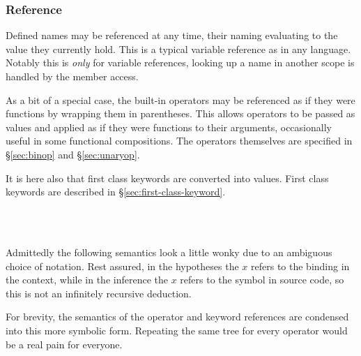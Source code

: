 \subsubsection{Reference}

Defined names may be referenced at any time, their naming evaluating to the value
they currently hold. This is a typical variable reference as in any language.
Notably this is \emph{only} for variable references, looking up a name in another
scope is handled by the member access.

As a bit of a special case, the built-in operators may be referenced as if they
were functions by wrapping them in parentheses. This allows operators to be passed
as values and applied as if they were functions to their arguments, occasionally
useful in some functional compositions. The operators themselves are specified
in \S\ref{sec:binop} and \S\ref{sec:unaryop}.

It is here also that first class keywords are converted into values.
First class keywords are described in \S\ref{sec:first-class-keyword}.

\begin{bnf*}
     \\
     \\
\end{bnf*}

Admittedly the following semantics look a little wonky due to an ambiguous choice
of notation. Rest assured, in the hypotheses the $x$ refers to the binding in the
context, while in the inference the $x$ refers to the symbol in source code, so
this is not an infinitely recursive deduction.

\begin{prooftree}
\end{prooftree}

For brevity, the semantics of the operator and keyword references are condensed
into this more symbolic form. Repeating the same tree for every operator would
be a real pain for everyone.

